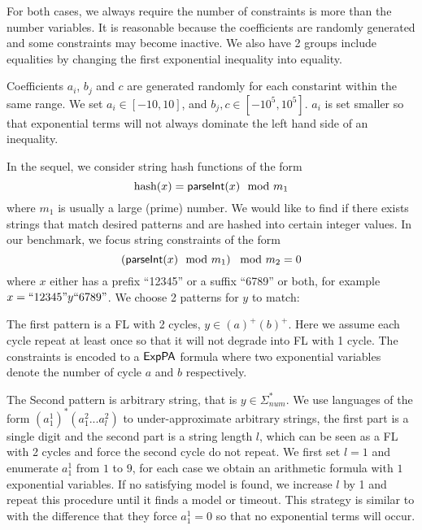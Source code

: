 {For both cases, we always require the number of constraints is more than the number variables. It is reasonable because the coefficients are randomly generated and some constraints may become inactive. We also have 2 groups include equalities by changing the first exponential inequality into equality.  

Coefficients $a_i$, $b_j$ and $c$ are generated randomly for each constarint within the same range. We set $a_i\in [-10,10]$, and $b_j,c\in[-10^5,10^5]$. $a_i$ is set smaller so that exponential terms will not always dominate the left hand side of an inequality.


In the sequel, we consider string hash functions of the form  
\begin{equation}
    \text{hash}(x)= \textsf{parseInt}(x) \mod m_1  \notag
\end{equation}
where $m_1$ is usually a large (prime) number. We would like to find if there exists strings that match desired patterns and are hashed into certain integer values. In our benchmark, we focus string constraints of the form
\begin{equation}
    \left( \textsf{parseInt}(x) \mod m_1\right) \mod m_2 = 0   \notag
\end{equation}
where $x$ either has a prefix ``12345'' or a suffix ``6789'' or both, for example $x=``12345"y``6789"$. We choose 2 patterns for $y$ to match: 

The first pattern is a FL with 2 cycles, $y \in (a)^+(b)^+$. Here we assume each cycle repeat at least once so that it will not degrade into FL with 1 cycle. The constraints is encoded to a ${\sf ExpPA}$ formula where two exponential variables denote the number of cycle $a$ and $b$ respectively.

The Second pattern is arbitrary string, that is $y\in \Sigma_{num}^*$. We use languages of the form $(a^1_1)^* (a^2_1...a^2_l)$ to under-approximate arbitrary strings, the first part is a single digit and the second part is a string length $l$, which can be seen as a FL with 2 cycles and force the second cycle do not repeat. We first set $l=1$ and enumerate $a^1_1$ from $1$ to $9$, for each case we obtain an arithmetic formula with $1$ exponential variables. If no satisfying model is found, we increase $l$ by 1 and repeat this procedure until it finds a model or timeout. This strategy is similar to \cite{Abdulla2020} with the difference that they force $a^1_1=0$ so that no exponential terms will occur.
}

